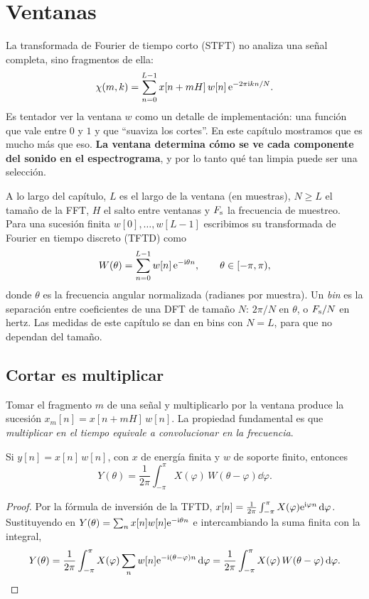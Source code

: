 \chapter{Ventanas}\label{cap:ventanas}

La transformada de Fourier de tiempo corto (STFT) no analiza una señal completa, sino fragmentos
de ella:
\[
  \chi(m,k)=\sum_{n=0}^{L-1}x[n+mH]\,w[n]\,\mathrm{e}^{-2\pi\mathrm{i} kn/N}.
\]
Es tentador ver la ventana $w$ como un detalle de implementación: una función que vale entre $0$ y
$1$ y que ``suaviza los cortes''. En este capítulo mostramos que es mucho más que eso.
\textbf{La ventana determina cómo se ve cada componente del sonido en el espectrograma}, y por lo
tanto qué tan limpia puede ser una selección.

A lo largo del capítulo, $L$ es el largo de la ventana (en muestras), $N\ge L$ el tamaño de la
FFT, $H$ el salto entre ventanas y $F_{\mathrm{s}}$ la frecuencia de muestreo. Para una sucesión finita
$w[0],\dots,w[L-1]$ escribimos su transformada de Fourier en tiempo discreto (TFTD) como
\[
  W(\theta)=\sum_{n=0}^{L-1}w[n]\,\mathrm{e}^{-\mathrm{i}\theta n},\qquad \theta\in[-\pi,\pi),
\]
donde $\theta$ es la frecuencia angular normalizada (radianes por muestra). Un \emph{bin} es la
separación entre coeficientes de una DFT de tamaño $N$: $2\pi/N$ en $\theta$, o $F_{\mathrm{s}}/N$ en
hertz. Las medidas de este capítulo se dan en bins con $N=L$, para que no dependan del tamaño.

\section{Cortar es multiplicar}

Tomar el fragmento $m$ de una señal y multiplicarlo por la ventana produce la sucesión
$x_m[n]=x[n+mH]\,w[n]$. La propiedad fundamental es que \emph{multiplicar en el tiempo equivale
a convolucionar en la frecuencia}.

\begin{proposicion}\label{prop:modulacion}
Si $y[n]=x[n]\,w[n]$, con $x$ de energía finita y $w$ de soporte finito, entonces
\[
  Y(\theta)=\frac{1}{2\pi}\int_{-\pi}^{\pi}X(\varphi)\,W(\theta-\varphi)\dd\varphi .
\]
\end{proposicion}

\begin{proof}
Por la fórmula de inversión de la TFTD, $x[n]=\frac{1}{2\pi}\int_{-\pi}^{\pi}X(\varphi)\mathrm{e}^{\mathrm{i}\varphi n}\,\mathrm{d}\varphi$.
Sustituyendo en $Y(\theta)=\sum_n x[n]w[n]\mathrm{e}^{-\mathrm{i}\theta n}$ e intercambiando la suma finita con la
integral,
\[
  Y(\theta)=\frac{1}{2\pi}\int_{-\pi}^{\pi}X(\varphi)\sum_{n}w[n]\mathrm{e}^{-\mathrm{i}(\theta-\varphi)n}\,\mathrm{d}\varphi
           =\frac{1}{2\pi}\int_{-\pi}^{\pi}X(\varphi)\,W(\theta-\varphi)\,\mathrm{d}\varphi. \qedhere
\]
\end{proof}

